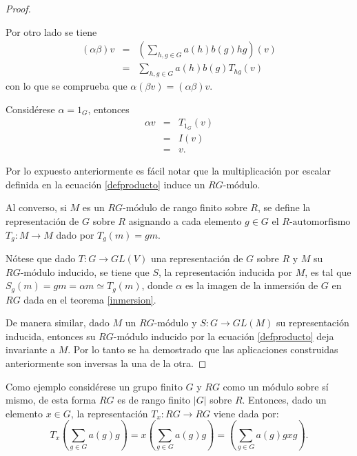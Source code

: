 \begin{proof}
\begin{bulletList}
 Por otro lado se tiene
 \begin{eqnarray*}
 (\alpha\beta)v &=& \left( \sum_{h,g \in G}a(h)b(g)hg  \right)(v)\\
  &=& \sum_{h,g \in G}a(h)b(g)T_{hg}(v)
 \end{eqnarray*}
 con lo que se comprueba que $\alpha(\beta v) = (\alpha\beta)v$.
 \item Considérese $\alpha = 1_{G}$, entonces
 \begin{eqnarray*}
 \alpha v &=& T_{1_G}(v)\\
  &=& I(v) \\
  &=& v.
 \end{eqnarray*}
 \end{bulletList}
  Por lo expuesto anteriormente es fácil notar que la multiplicación por escalar definida en la ecuación \ref{defproducto} induce un $RG\mbox{-módulo}$.
 
 Al converso, si $M$ es un $RG\mbox{-módulo}$ de rango finito sobre $R$, se define la representación de $G$ sobre $R$ asignando a cada elemento $g \in G$ el $R\mbox{-automorfismo}$ $T_g \colon M \to M$ dado por $T_g(m) = gm$.
 
 Nótese que dado $T \colon G \to GL(V)$ una representación de $G$ sobre $R$ y $M$ su $RG\mbox{-módulo}$ inducido, se tiene que $S$, la representación inducida por $M$, es tal que $S_g(m) = gm = \alpha m \simeq T_g(m)$, donde $\alpha$ es la imagen de la inmersión de $G$ en $RG$ dada en el teorema \ref{inmersion}.
 
 De manera similar, dado $M$ un $RG\mbox{-módulo}$ y $S \colon G \to GL(M)$ su representación inducida, entonces su $RG\mbox{-módulo}$ inducido por la ecuación \ref{defproducto} deja invariante a $M$. Por lo tanto se ha demostrado que las aplicaciones construidas anteriormente son inversas la una de la otra. 
 \end{proof}
  Como ejemplo considérese  un grupo finito $G$ y $RG$ como un módulo sobre sí mismo, de esta forma $RG$ es de rango finito $|G|$ sobre $R$. Entonces, dado un elemento $x \in G$, la representación $T_x \colon RG \to RG$ viene dada por: \begin{equation*}T_{x}\left( \sum_{g \in G}a(g)g\right) = x\left( \sum_{g \in G}a(g)g\right) = \left( \sum_{g \in G}a(g)gxg\right).\end{equation*}
  
